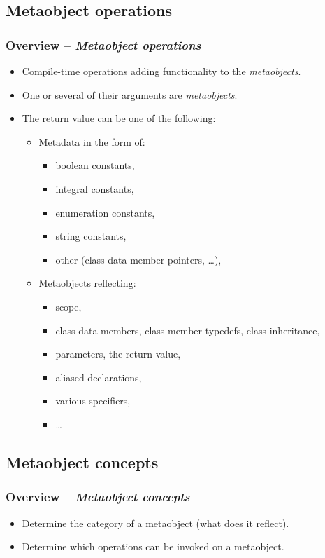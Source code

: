 \documentclass[compress,table,xcolor=table]{beamer}
\begin{document}
\subsection{Metaobject operations}
\begin{frame}
\frametitle{Overview -- {\em Metaobject operations}}
  \begin{itemize}
    \small
    \item Compile-time operations adding functionality to the {\em metaobjects}.
    \item One or several of their arguments are {\em metaobjects}.
    \item The return value can be one of the following:
    \begin{itemize}
      \footnotesize
      \item Metadata in the form of:
      \begin{itemize}
        \item boolean constants,
        \item integral constants,
        \item enumeration constants,
        \item string constants,
        \item other (class data member pointers, \ldots),
      \end{itemize}
      \item Metaobjects reflecting:
      \begin{itemize}
        \item scope,
        \item class data members, class member typedefs, class inheritance,
        \item parameters, the return value,
        \item aliased declarations,
        \item various specifiers,
        \item \ldots
      \end{itemize}
    \end{itemize}
  \end{itemize}
\end{frame}

\subsection{Metaobject concepts}
\begin{frame}
\frametitle{Overview -- {\em Metaobject concepts}}
  \begin{itemize}
    \small
    \item Determine the category of a metaobject (what does it reflect).
    \item Determine which operations can be invoked on a metaobject.
  \end{itemize}
\end{frame}
\end{document}
